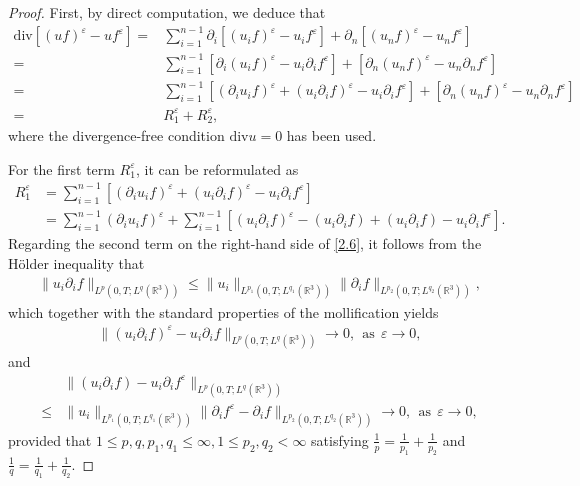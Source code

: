 \documentclass[10pt,a4paper]{amsart}
\newcommand{\ba}{\begin{aligned}}
\newcommand{\be}{\begin{equation}}
\newcommand{\ea}{\end{aligned}}
\newcommand{\ee}{\end{equation}}
\newcommand{\f}{\frac}
\newcommand{\s}{\mathrm{div}}
\begin{document}
\begin{proof}
First, by direct computation, we deduce that
	\be\label{2.5}\ba \s[(uf)^\varepsilon  -   u  f^\varepsilon   ]  =&  \sum_{i=1}^{  n-1}\partial_{i}[(u_{i}f)^\varepsilon  -   u_{i}  f^\varepsilon   ] +\partial_{n}[(u_{n}f)^\varepsilon  -   u_{n}  f^\varepsilon   ]\\ = & \sum_{i=1}^{  n-1}[\partial_{i}(u_{i}f)^\varepsilon  -   u_{i}  \partial_{i}f^\varepsilon   ] +[\partial_{n}(u_{n}f)^\varepsilon  -   u_{n}\partial_{n}  f^\varepsilon   ]\\ = & \sum_{i=1}^{  n-1}[(\partial_{i}u_{i}f)^\varepsilon + (u_{i}\partial_{i}f)^\varepsilon-   u_{i}  \partial_{i}f^\varepsilon   ] +[\partial_{n}(u_{n}f)^\varepsilon  -   u_{n}\partial_{n}  f^\varepsilon   ]\\
	=&R_1^\varepsilon +R_2^\varepsilon,\ea\ee
	where the divergence-free condition $\s u=0$ has been used.
	
	For the first term $R_1^\varepsilon$, it can be reformulated as
	\be\label{2.6}
	\ba
	R_1^\varepsilon&=\sum_{i=1}^{  n-1}[(\partial_{i}u_{i}f)^\varepsilon + (u_{i}\partial_{i}f)^\varepsilon-   u_{i}  \partial_{i}f^\varepsilon   ]\\
	&=\sum_{i=1}^{  n-1}(\partial_i u_i f)^\varepsilon+ \sum_{i=1}^{  n-1}[(u_i \partial_i f)^\varepsilon -(u_i \partial_i f)+(u_i \partial_i f)-u_i \partial_i f^\varepsilon].
		\ea\ee
Regarding the second term on the right-hand side of \eqref{2.6}, it follows from the H\"older inequality that
\be\label{2.7}\ba
\|u_i \partial_i f\|_{L^p(0,T;L^q(\mathbb{R}^3))}\leq \|u_i\|_{L^{p_1}(0,T;L^{q_1}(\mathbb{R}^3))}\|\partial_i f\|_{L^{p_2}(0,T;L^{q_2}(\mathbb{R}^3))},
\ea\ee
which together with the standard properties of the mollification yields
\be\label{2.8}\ba
\|(u_i \partial_i f)^\varepsilon - u_i \partial_i f\|_{L^p(0,T;L^q(\mathbb{R}^3))}\rightarrow 0,~~\text{as}~~\varepsilon \to 0,
 \ea\ee	
and
\be\label{2.9}\ba
&\|(u_i \partial_i f)-u_i \partial_i f^\varepsilon\|_{L^p(0,T;L^q(\mathbb{R}^3))}\\
\leq& \|u_i\|_{L^{p_1}(0,T;L^{q_1}(\mathbb{R}^3))}\|\partial_i f^\varepsilon -\partial_i f\|_{L^{p_2}(0,T;L^{q_2}(\mathbb{R}^3))}\to 0, ~~\text{as}~~\varepsilon \to 0,
\ea\ee
provided that $1\leq p,q, p_1, q_1\leq \infty, 1\leq p_2,q_2<\infty$ satisfying $\f1p=\frac{1}{p_1}+\frac{1}{p_2}$ and $\frac{1}{q}=\frac{1}{q_1}+\frac{1}{q_2}$.


\end{proof}
\end{document}
